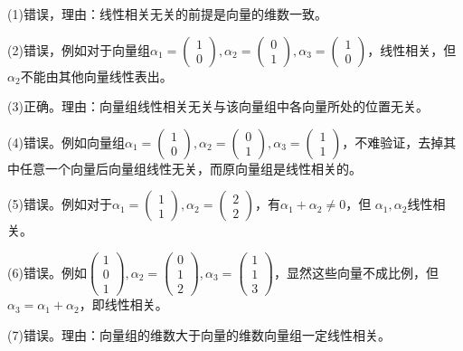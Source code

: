 \documentclass[a4paper]{report}
\begin{document}
\begin{jie}
(1)错误，理由：线性相关无关的前提是向量的维数一致。

(2)错误，例如对于向量组$\alpha_1=
\begin{pmatrix}
1\\ 0
\end{pmatrix}
,\alpha_2=
\begin{pmatrix}
0\\ 1
\end{pmatrix},\alpha_3=
\begin{pmatrix}
1\\ 0
\end{pmatrix}$，线性相关，但$\alpha_2$不能由其他向量线性表出。

(3)正确。理由：向量组线性相关无关与该向量组中各向量所处的位置无关。

(4)错误。例如向量组$\alpha_1=
\begin{pmatrix}
1\\ 0
\end{pmatrix}
,\alpha_2=
\begin{pmatrix}
0\\ 1
\end{pmatrix},\alpha_3=
\begin{pmatrix}
1\\ 1
\end{pmatrix}$，不难验证，去掉其中任意一个向量后向量组线性无关，而原向量组是线性相关的。

(5)错误。例如对于$\alpha_1=
\begin{pmatrix}
1\\ 1
\end{pmatrix}
,\alpha_2=
\begin{pmatrix}
2\\ 2
\end{pmatrix}$，有$\alpha_1+\alpha_2\neq 0$，但 $\alpha_1,\alpha_2$线性相关。

(6)错误。例如$
\begin{pmatrix}
1\\ 0\\ 1
\end{pmatrix}
,\alpha_2=
\begin{pmatrix}
0\\ 1 \\2
\end{pmatrix},\alpha_3=
\begin{pmatrix}
1\\ 1 \\3
\end{pmatrix}$，显然这些向量不成比例，但$\alpha_3=\alpha_1+\alpha_2$，即线性相关。

(7)错误。理由：向量组的维数大于向量的维数向量组一定线性相关。
\end{jie}
\end{document}
